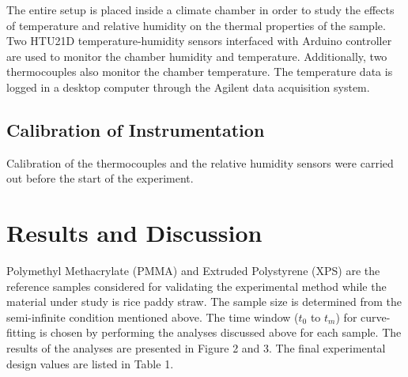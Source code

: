 \documentclass[12pt]{article}
\begin{document}
The entire setup is placed inside a climate
chamber in order to study the effects of temperature and relative
humidity on the thermal properties of the sample. Two HTU21D temperature-humidity sensors
interfaced with Arduino controller are used to monitor the chamber
humidity and temperature. Additionally, two thermocouples also
monitor the chamber temperature. The temperature data is logged in a
desktop computer through the Agilent data acquisition system.
\\

\subsection*{Calibration of Instrumentation}
Calibration of the thermocouples and the relative humidity sensors were
carried out before the start of the experiment.




\section*{Results and Discussion}

Polymethyl Methacrylate (PMMA) and Extruded Polystyrene (XPS) are the
reference samples considered for validating the experimental method
while the material under study is rice paddy straw.  The
sample size is determined from the semi-infinite condition mentioned
above. The time window (\(t_0\) to \(t_m\)) for curve-fitting is chosen
by performing the analyses discussed above for each sample. The results
of the analyses are presented in Figure 2 and 3. The final experimental
design values are listed in Table 1.
\end{document}
